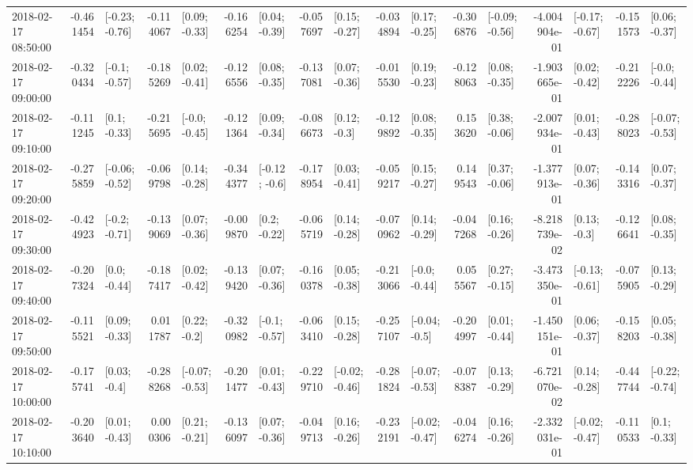 \begin{tabular}{lrlrlrlrlrlrlrlrl}
2018-02-17 08:50:00 & -0.461454 &  [-0.23; -0.76] & -0.114067 &   [0.09; -0.33] & -0.166254 &   [0.04; -0.39] & -0.057697 &   [0.15; -0.27] & -0.034894 &   [0.17; -0.25] & -0.306876 &  [-0.09; -0.56] & -4.004904e-01 &  [-0.17; -0.67] & -0.151573 &   [0.06; -0.37] \\
2018-02-17 09:00:00 & -0.320434 &   [-0.1; -0.57] & -0.185269 &   [0.02; -0.41] & -0.126556 &   [0.08; -0.35] & -0.137081 &   [0.07; -0.36] & -0.015530 &   [0.19; -0.23] & -0.128063 &   [0.08; -0.35] & -1.903665e-01 &   [0.02; -0.42] & -0.212226 &   [-0.0; -0.44] \\
2018-02-17 09:10:00 & -0.111245 &    [0.1; -0.33] & -0.215695 &   [-0.0; -0.45] & -0.121364 &   [0.09; -0.34] & -0.086673 &    [0.12; -0.3] & -0.129892 &   [0.08; -0.35] &  0.153620 &   [0.38; -0.06] & -2.007934e-01 &   [0.01; -0.43] & -0.288023 &  [-0.07; -0.53] \\
2018-02-17 09:20:00 & -0.275859 &  [-0.06; -0.52] & -0.069798 &   [0.14; -0.28] & -0.344377 &   [-0.12; -0.6] & -0.178954 &   [0.03; -0.41] & -0.059217 &   [0.15; -0.27] &  0.149543 &   [0.37; -0.06] & -1.377913e-01 &   [0.07; -0.36] & -0.143316 &   [0.07; -0.37] \\
2018-02-17 09:30:00 & -0.424923 &   [-0.2; -0.71] & -0.139069 &   [0.07; -0.36] & -0.009870 &    [0.2; -0.22] & -0.065719 &   [0.14; -0.28] & -0.070962 &   [0.14; -0.29] & -0.047268 &   [0.16; -0.26] & -8.218739e-02 &    [0.13; -0.3] & -0.126641 &   [0.08; -0.35] \\
2018-02-17 09:40:00 & -0.207324 &    [0.0; -0.44] & -0.187417 &   [0.02; -0.42] & -0.139420 &   [0.07; -0.36] & -0.160378 &   [0.05; -0.38] & -0.213066 &   [-0.0; -0.44] &  0.055567 &   [0.27; -0.15] & -3.473350e-01 &  [-0.13; -0.61] & -0.075905 &   [0.13; -0.29] \\
2018-02-17 09:50:00 & -0.115521 &   [0.09; -0.33] &  0.011787 &    [0.22; -0.2] & -0.320982 &   [-0.1; -0.57] & -0.063410 &   [0.15; -0.28] & -0.257107 &   [-0.04; -0.5] & -0.204997 &   [0.01; -0.44] & -1.450151e-01 &   [0.06; -0.37] & -0.158203 &   [0.05; -0.38] \\
2018-02-17 10:00:00 & -0.175741 &    [0.03; -0.4] & -0.288268 &  [-0.07; -0.53] & -0.201477 &   [0.01; -0.43] & -0.229710 &  [-0.02; -0.46] & -0.281824 &  [-0.07; -0.53] & -0.078387 &   [0.13; -0.29] & -6.721070e-02 &   [0.14; -0.28] & -0.447744 &  [-0.22; -0.74] \\
2018-02-17 10:10:00 & -0.203640 &   [0.01; -0.43] &  0.000306 &   [0.21; -0.21] & -0.136097 &   [0.07; -0.36] & -0.049713 &   [0.16; -0.26] & -0.232191 &  [-0.02; -0.47] & -0.046274 &   [0.16; -0.26] & -2.332031e-01 &  [-0.02; -0.47] & -0.110533 &    [0.1; -0.33] \\

\end{tabular}
